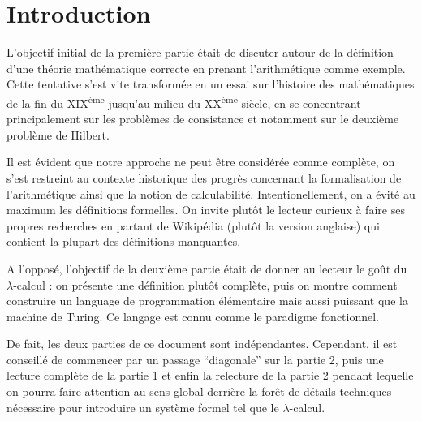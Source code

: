 \documentclass[12pt, a4paper]{article}
\begin{document}
	
\section*{Introduction}
L'objectif initial de la première partie était de discuter autour de la définition d'une théorie mathématique correcte en prenant l'arithmétique comme exemple. Cette tentative s'est vite transformée en un essai sur l'histoire des mathématiques de la fin du XIX\textsuperscript{ème} jusqu'au milieu du XX\textsuperscript{ème} siècle, en se concentrant principalement sur les problèmes de consistance et notamment sur le deuxième problème de Hilbert.

Il est évident que notre approche ne peut être considérée comme complète, on s'est restreint au contexte historique des progrès concernant la formalisation de l'arithmétique ainsi que la notion de calculabilité. Intentionellement, on a évité au maximum les définitions formelles. On invite plutôt le lecteur curieux à faire ses propres recherches en partant de Wikipédia (plutôt la version anglaise) qui contient la plupart des définitions manquantes.

A l'opposé, l'objectif de la deuxième partie était de donner au lecteur le goût du $\lambda$-calcul : on présente une définition plutôt complète, puis on montre comment construire un language de programmation élémentaire mais aussi puissant que la machine de Turing. Ce langage est connu comme le paradigme fonctionnel.

De fait, les deux parties de ce document sont indépendantes. Cependant, il est conseillé de commencer par un passage ``diagonale'' sur la partie 2, puis une lecture complète de la partie 1 et enfin la relecture de la partie 2 pendant lequelle on pourra faire attention au sens global derrière la forêt de détails techniques nécessaire pour introduire un système formel tel que le $\lambda$-calcul.
	



\end{document}
